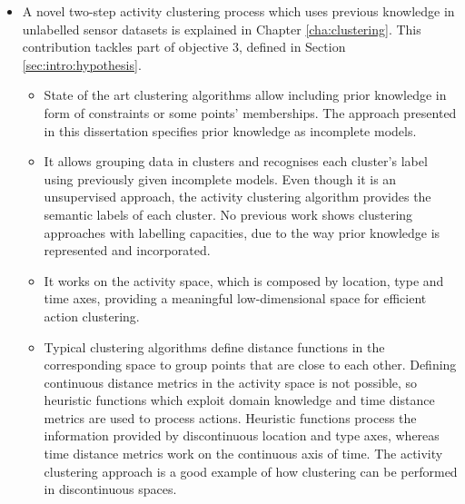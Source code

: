 \begin{itemize}
 \item A novel two-step activity clustering process which uses previous knowledge in unlabelled sensor datasets is explained in Chapter \ref{cha:clustering}. This contribution tackles part of objective 3, defined in Section \ref{sec:intro:hypothesis}. %
 \begin{itemize}
  \item State of the art clustering algorithms allow including prior knowledge in form of constraints or some points' memberships. The approach presented in this dissertation specifies prior knowledge as incomplete models.
  \item It allows grouping data in clusters and recognises each cluster's label using previously given incomplete models. Even though it is an unsupervised approach, the activity clustering algorithm provides the semantic labels of each cluster. No previous work shows clustering approaches with labelling capacities, due to the way prior knowledge is represented and incorporated.
  \item It works on the activity space, which is composed by location, type and time axes, providing a meaningful low-dimensional space for efficient action clustering.
  \item Typical clustering algorithms define distance functions in the corresponding space to group points that are close to each other. Defining continuous distance metrics in the activity space is not possible, so heuristic functions which exploit domain knowledge and time distance metrics are used to process actions. Heuristic functions process the information provided by discontinuous location and type axes, whereas time distance metrics work on the continuous axis of time. The activity clustering approach is a good example of how clustering can be performed in discontinuous spaces.
 \end{itemize}


\end{itemize}
